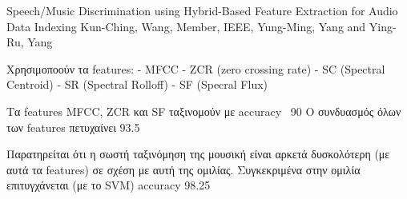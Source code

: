 Speech/Music Discrimination using Hybrid-Based Feature Extraction for Audio Data Indexing
Kun-Ching, Wang, Member, IEEE, Yung-Ming, Yang and Ying-Ru, Yang

Χρησιμοποούν τα features:
- ΜFCC
- ZCR (zero crossing rate)
- SC (Spectral Centroid)
- SR (Spectral Rolloff)
- SF (Specral Flux)

Τα features ΜFCC, ZCR και SF ταξινομούν με accuracy ~90%
Ο συνδυασμός όλων των features πετυχαίνει 93.5%

Παρατηρείται ότι η σωστή ταξινόμηση της μουσική είναι αρκετά δυσκολότερη (με αυτά τα features) σε σχέση με αυτή της ομιλίας. Συγκεκριμένα στην ομιλία επιτυγχάνεται (με το SVM) accuracy 98.25%